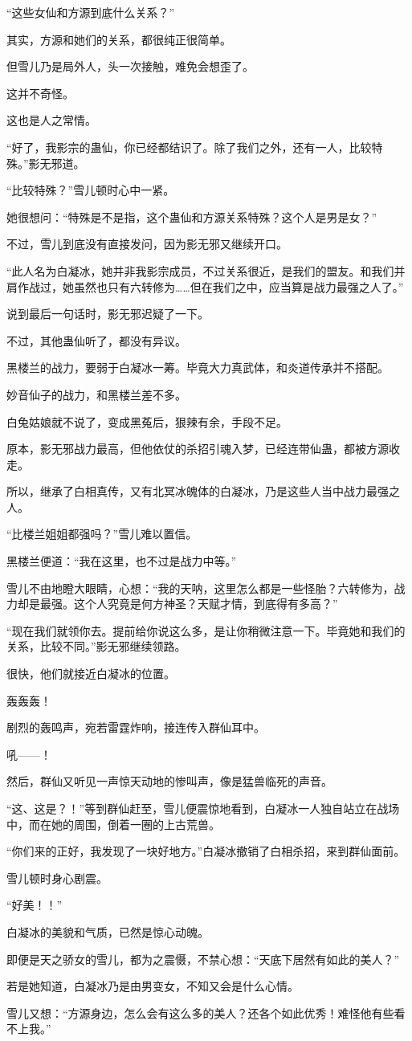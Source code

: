 \begin{this_body}
“这些女仙和方源到底什么关系？”

其实，方源和她们的关系，都很纯正很简单。

但雪儿乃是局外人，头一次接触，难免会想歪了。

这并不奇怪。

这也是人之常情。

“好了，我影宗的蛊仙，你已经都结识了。除了我们之外，还有一人，比较特殊。”影无邪道。

“比较特殊？”雪儿顿时心中一紧。

她很想问：“特殊是不是指，这个蛊仙和方源关系特殊？这个人是男是女？”

不过，雪儿到底没有直接发问，因为影无邪又继续开口。

“此人名为白凝冰，她并非我影宗成员，不过关系很近，是我们的盟友。和我们并肩作战过，她虽然也只有六转修为……但在我们之中，应当算是战力最强之人了。”

说到最后一句话时，影无邪迟疑了一下。

不过，其他蛊仙听了，都没有异议。

黑楼兰的战力，要弱于白凝冰一筹。毕竟大力真武体，和炎道传承并不搭配。

妙音仙子的战力，和黑楼兰差不多。

白兔姑娘就不说了，变成黑菟后，狠辣有余，手段不足。

原本，影无邪战力最高，但他依仗的杀招引魂入梦，已经连带仙蛊，都被方源收走。

所以，继承了白相真传，又有北冥冰魄体的白凝冰，乃是这些人当中战力最强之人。

“比楼兰姐姐都强吗？”雪儿难以置信。

黑楼兰便道：“我在这里，也不过是战力中等。”

雪儿不由地瞪大眼睛，心想：“我的天呐，这里怎么都是一些怪胎？六转修为，战力却是最强。这个人究竟是何方神圣？天赋才情，到底得有多高？”

“现在我们就领你去。提前给你说这么多，是让你稍微注意一下。毕竟她和我们的关系，比较不同。”影无邪继续领路。

很快，他们就接近白凝冰的位置。

轰轰轰！

剧烈的轰鸣声，宛若雷霆炸响，接连传入群仙耳中。

吼——！

然后，群仙又听见一声惊天动地的惨叫声，像是猛兽临死的声音。

“这、这是？！”等到群仙赶至，雪儿便震惊地看到，白凝冰一人独自站立在战场中，而在她的周围，倒着一圈的上古荒兽。

“你们来的正好，我发现了一块好地方。”白凝冰撤销了白相杀招，来到群仙面前。

雪儿顿时身心剧震。

“好美！！”

白凝冰的美貌和气质，已然是惊心动魄。

即便是天之骄女的雪儿，都为之震慑，不禁心想：“天底下居然有如此的美人？”

若是她知道，白凝冰乃是由男变女，不知又会是什么心情。

雪儿又想：“方源身边，怎么会有这么多的美人？还各个如此优秀！难怪他有些看不上我。”

\end{this_body}

